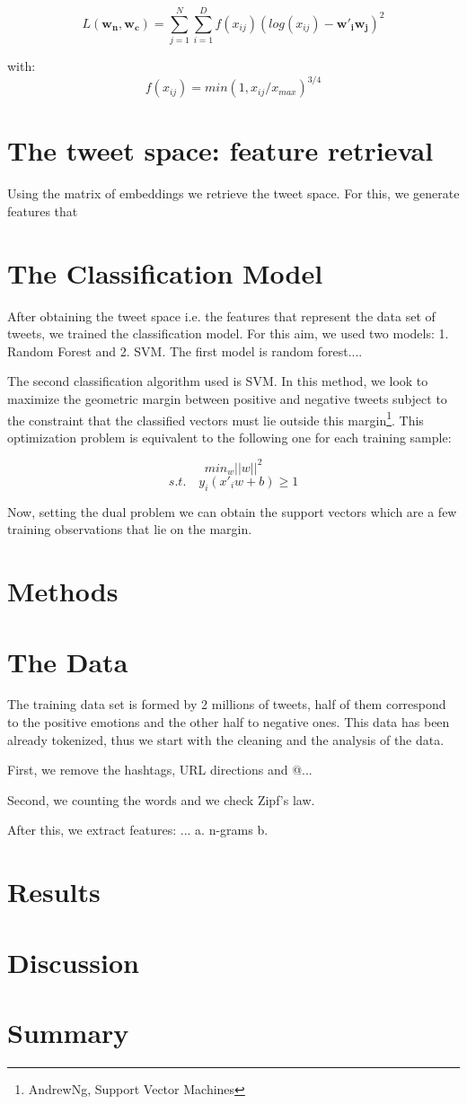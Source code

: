 \documentclass[10pt,conference,compsocconf]{IEEEtran}
\begin{document}
$$L(\textbf{w}_{\textbf{n}},\textbf{w}_{\textbf{c}})=\sum_{j=1}^{N}\sum_{i=1}^{D}f(x_{ij})(log(x_{ij})-\textbf{w}'_{\textbf{i}}\textbf{w}_{\textbf{j}})^2$$ 

with: 
$$f(x_{ij})=min(1,x_{ij}/x_{max})^{3/4}$$ 
\section{The tweet space: feature retrieval}
Using the matrix of embeddings we retrieve the tweet space. For this, we generate features that  

\section{The Classification Model}
After obtaining the tweet space i.e. the features that represent the data set of tweets, we trained the classification model. For this aim, we used two models: 1. Random Forest and 2. SVM. 
The first model is random forest....

The second classification algorithm used is SVM. In this method, we look to maximize the geometric margin between positive and negative tweets subject to the constraint that the classified vectors must lie outside this margin\footnote{AndrewNg, Support Vector Machines}. This optimization problem is equivalent to the following one for each training sample:

$$min_w || w ||^2$$
$$s.t. \quad y_i(x'_iw +b)\geq 1$$

 Now, setting the dual problem we can obtain the support vectors which are a few training observations that lie on the margin. 
 
\section{Methods}
\label{S2}



\section{The Data}
\label{S3}

The training data set is formed by 2 millions of tweets, half of them correspond to the positive emotions and the other half to negative ones. This data has been already tokenized, thus we start with the cleaning and the analysis of the data.  

First, we remove the hashtags, URL directions and @... 

Second, we  counting the words and we check Zipf's law.

After this, we extract features: ... 
a. n-grams 
b. 

\section{Results}
\label{S4}

\section{Discussion}
\label{S5}

\section{Summary}
\label{S6}



\end{document}
